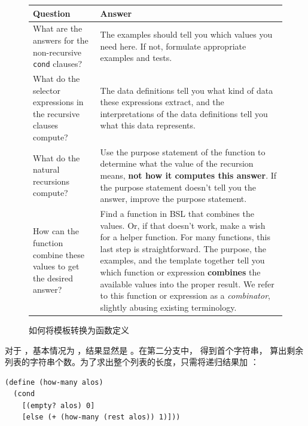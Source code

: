 \begin{figure}[htbp]
  \centering
  \footnotesize
  \setlength{\tabcolsep}{4pt}
  \begin{tabular}{@{}>{\raggedright\arraybackslash}p{}>{\raggedright\arraybackslash}p{}@{}}
    \toprule
    \textbf{Question} & \textbf{Answer} \\
    \midrule
    What are the answers for the non-recursive \texttt{cond} clauses? &
    The examples should tell you which values you need here. If not, formulate appropriate examples and tests. \\
    \addlinespace[4pt]
    What do the selector expressions in the recursive clauses compute? &
    The data definitions tell you what kind of data these expressions extract, and the interpretations of the data definitions tell you what this data represents. \\
    \addlinespace[4pt]
    What do the natural recursions compute? &
    Use the purpose statement of the function to determine what the value of the recursion means, \textbf{not how it computes this answer}. If the purpose statement doesn't tell you the answer, improve the purpose statement. \\
    \addlinespace[4pt]
    How can the function combine these values to get the desired answer? &
    Find a function in BSL that combines the values. Or, if that doesn't work, make a wish for a helper function. For many functions, this last step is straightforward. The purpose, the examples, and the template together tell you which function or expression \textbf{combines} the available values into the proper result. We refer to this function or expression as a \textit{combinator}, slightly abusing existing terminology. \\
    \bottomrule
  \end{tabular}
  \caption{如何将模板转换为函数定义}
  \label{fig:turn_template_into_function}
\end{figure}

对于 ，基本情况为 ，结果显然是 。在第二分支中， 得到首个字符串， 算出剩余列表的字符串个数。为了求出整个列表的长度，只需将递归结果加 ：
\begin{lstlisting}[language=BSL]
(define (how-many alos)
  (cond
    [(empty? alos) 0]
    [else (+ (how-many (rest alos)) 1)]))
\end{lstlisting}


